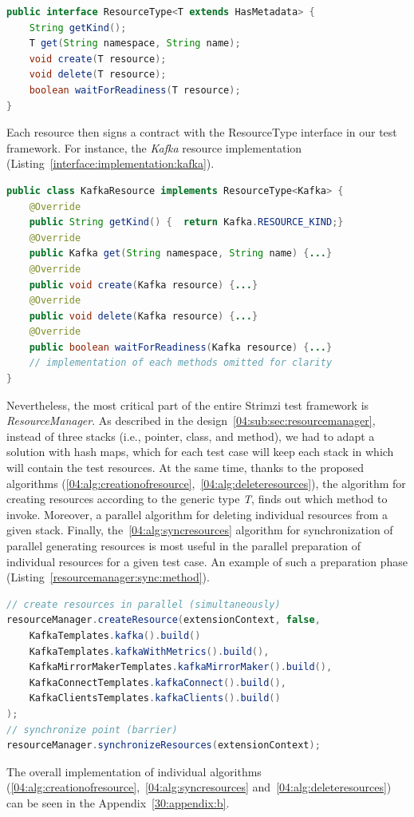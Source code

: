 \begin{lstlisting}[language=Java,label=interface:resourcetype,caption=Interface used across all resources,frame=tb]
public interface ResourceType<T extends HasMetadata> {
    String getKind();
    T get(String namespace, String name);
    void create(T resource);
    void delete(T resource);
    boolean waitForReadiness(T resource);
}
\end{lstlisting}
Each resource then signs a contract with the ResourceType interface in our test framework.
For instance, the \emph{Kafka} resource implementation (Listing~\ref{interface:implementation:kafka}).
\begin{lstlisting}[language=Java,label=interface:implementation:kafka,caption=Kafka resource sings contract with ResourceType interface,frame=tb]
public class KafkaResource implements ResourceType<Kafka> {
    @Override
    public String getKind() {  return Kafka.RESOURCE_KIND;}
    @Override
    public Kafka get(String namespace, String name) {...}
    @Override
    public void create(Kafka resource) {...}
    @Override
    public void delete(Kafka resource) {...}
    @Override
    public boolean waitForReadiness(Kafka resource) {...}
    // implementation of each methods omitted for clarity
}
\end{lstlisting}

Nevertheless, the most critical part of the entire Strimzi test framework is \emph{ResourceManager}.
As described in the design~\ref{04:sub:sec:resourcemanager}, instead of three stacks (i.e., pointer, class, and method),
we had to adapt a solution with hash maps, which for each test case will keep each stack in which will contain the test resources.
At the same time, thanks to the proposed algorithms (\ref{04:alg:creationofresource},~\ref{04:alg:deleteresources}),
the algorithm for creating resources according to the generic type \emph{T}, finds out which method to invoke.
Moreover, a parallel algorithm for deleting individual resources from a given stack.
Finally, the~\ref{04:alg:syncresources} algorithm for synchronization of parallel generating resources is most useful
in the parallel preparation of individual resources for a given test case.
An example of such a preparation phase (Listing~\ref{resourcemanager:sync:method}).
\begin{lstlisting}[language=Java,label=resourcemanager:sync:method,caption=Example of parallel preparation of resources,frame=tb]
// create resources in parallel (simultaneously)
resourceManager.createResource(extensionContext, false,
    KafkaTemplates.kafka().build()
    KafkaTemplates.kafkaWithMetrics().build(),
    KafkaMirrorMakerTemplates.kafkaMirrorMaker().build(),
    KafkaConnectTemplates.kafkaConnect().build(),
    KafkaClientsTemplates.kafkaClients().build()
);
// synchronize point (barrier)
resourceManager.synchronizeResources(extensionContext);
\end{lstlisting}
The overall implementation of individual algorithms (\ref{04:alg:creationofresource},~\ref{04:alg:syncresources} and~\ref{04:alg:deleteresources})
can be seen in the Appendix~\ref{30:appendix:b}.

